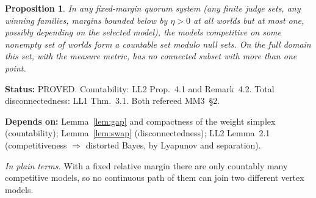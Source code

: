 \documentclass[11pt]{article}
\newtheorem{proposition}[theorem]{Proposition}
\theoremstyle{definition}
\theoremstyle{remark}
\newcommand{\src}[1]{\textsf{#1}}
\newcommand{\status}[1]{\par\smallskip\noindent\textbf{Status:} #1\par}
\newcommand{\deps}[1]{\noindent\textbf{Depends on:} #1\par}
\newcommand{\inwords}[1]{\noindent\textit{In plain terms.} #1\par\smallskip}
\begin{document}
\begin{proposition}\label{prop:countable}
In any fixed-margin quorum system (any finite judge sets, any winning families, margins bounded below by $\eta>0$ at all worlds but at most one, possibly depending on the selected model), the models competitive on some nonempty set of worlds form a countable set modulo null sets. On the full domain this set, with the measure metric, has no connected subset with more than one point.
\end{proposition}
\status{PROVED. Countability: \src{LL2} Prop.~4.1 and Remark~4.2. Total disconnectedness: \src{LL1} Thm.~3.1. Both refereed \src{MM3}~\S2.}
\deps{Lemma~\ref{lem:gap} and compactness of the weight simplex (countability); Lemma~\ref{lem:swap} (disconnectedness); \src{LL2} Lemma~2.1 (competitiveness $\Rightarrow$ distorted Bayes, by Lyapunov and separation).}
\inwords{With a fixed relative margin there are only countably many competitive models, so no continuous path of them can join two different vertex models.}
\end{document}
